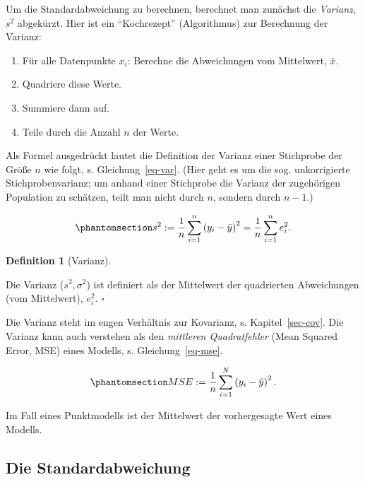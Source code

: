 \documentclass[
  letterpaper,
  oneside,
  open=any]{scrbook}
\providecommand{\tightlist}{%
  \setlength{\itemsep}{0pt}\setlength{\parskip}{0pt}}\usepackage{longtable,booktabs,array}
\theoremstyle{definition}
\theoremstyle{definition}
\theoremstyle{definition}
\newtheorem{definition}{Definition}[chapter]
\theoremstyle{remark}
\begin{document}
Um die Standardabweichung zu berechnen, berechnet man zunächst die
\emph{Varianz}, \(s^2\) abgekürzt. Hier ist ein \enquote{Kochrezept}
(Algorithmus) zur Berechnung der Varianz:

\begin{enumerate}
\def\labelenumi{\arabic{enumi}.}
\tightlist
\item
  Für alle Datenpunkte \(x_i\): Berechne die Abweichungen vom
  Mittelwert, \(\bar{x}\).
\item
  Quadriere diese Werte.
\item
  Summiere dann auf.
\item
  Teile durch die Anzahl \(n\) der Werte.
\end{enumerate}

Als Formel ausgedrückt lautet die Definition der Varianz einer
Stichprobe der Größe \(n\) wie folgt, s. Gleichung~\ref{eq-var}. (Hier
geht es um die sog. unkorrigierte Stichprobenvarianz; um anhand einer
Stichprobe die Varianz der zugehörigen Population zu schätzen, teilt man
nicht durch \(n\), sondern durch \(n-1\).)

\begin{equation}\phantomsection\label{eq-var}{{\displaystyle s^{2}:={\frac {1}{n}}\sum _{i=1}^{n}\left(y_{i}-{\bar {y}}\right)^{2}={\frac {1}{n}}\sum _{i=1}^{n}e_i^{2}.}}\end{equation}

\begin{definition}[Varianz]\protect\hypertarget{def-var}{}\label{def-var}

Die Varianz (\(s^2, \sigma^2\)) ist definiert als der Mittelwert der
quadrierten Abweichungen (vom Mittelwert), \(e_i^2\). \(\square\)

\end{definition}

Die Varianz steht im engen Verhältnis zur Kovarianz, s.
Kapitel~\ref{sec-cov}. Die Varianz kann auch verstehen als den
\emph{mittleren Quadratfehler} (Mean Squared Error, MSE) eines Modells,
s. Gleichung~\ref{eq-mse}.

\begin{equation}\phantomsection\label{eq-mse}{{\displaystyle MSE:={\frac {1}{n}}\sum _{i=1}^{N}\left(y_{i}-{\hat {y}}\right)^{2}.}}\end{equation}

Im Fall eines Punktmodells ist der Mittelwert der vorhergesagte Wert
eines Modells.

\subsection{Die Standardabweichung}\label{die-standardabweichung}
\end{document}
